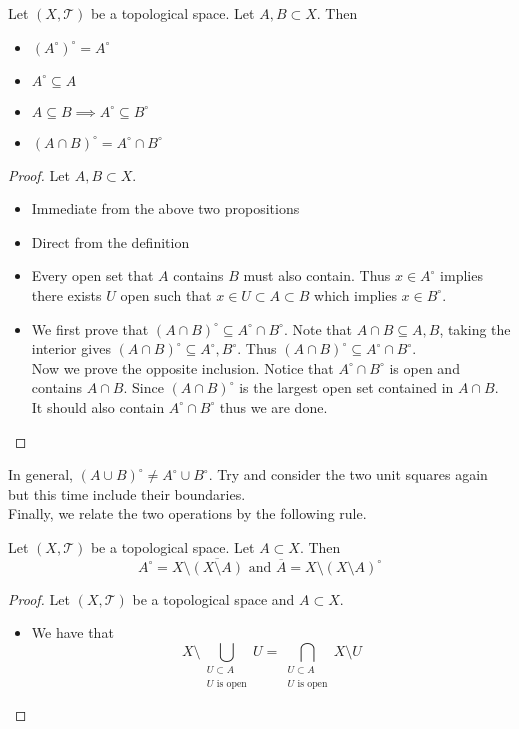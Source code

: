 \documentclass[a4paper]{article}
\begin{document}
\begin{prp}{}{} Let $(X,\mathcal{T})$ be a topological space. Let $A,B\subset X$. Then
\begin{itemize}
\item $(A^\circ)^\circ=A^\circ$
\item $A^\circ\subseteq A$
\item $A\subseteq B\implies A^\circ\subseteq B^\circ$
\item $(A\cap B)^\circ=A^\circ\cap B^\circ$
\end{itemize}
\begin{proof} Let $A,B\subset X$. 
\begin{itemize}
\item Immediate from the above two propositions
\item Direct from the definition
\item Every open set that $A$ contains $B$ must also contain. Thus $x\in A^\circ$ implies there exists $U$ open such that $x\in U\subset A\subset B$ which implies $x\in B^\circ$. 
\item We first prove that $(A\cap B)^\circ\subseteq A^\circ\cap B^\circ$. Note that $A\cap B\subseteq A,B$, taking the interior gives $(A\cap B)^\circ\subseteq A^\circ,B^\circ$. Thus $(A\cap B)^\circ\subseteq A^\circ\cap B^\circ$. \\
Now we prove the opposite inclusion. Notice that $A^\circ\cap B^\circ$ is open and contains $A\cap B$. Since $(A\cap B)^\circ$ is the largest open set contained in $A\cap B$. It should also contain $A^\circ\cap B^\circ$ thus we are done. 
\end{itemize}
\end{proof}
\end{prp}

In general, $(A\cup B)^\circ\neq A^\circ\cup B^\circ$. Try and consider the two unit squares again but this time include their boundaries. \\
Finally, we relate the two operations by the following rule. 

\begin{prp}{}{} Let $(X,\mathcal{T})$ be a topological space. Let $A\subset X$. Then $$A^\circ=X\setminus\overline{(X\setminus A)}\text{ and }\overline{A}=X\setminus(X\setminus A)^\circ$$ 
\begin{proof}
Let $(X,\mathcal{T})$ be a topological space and $A\subset X$. 
\begin{itemize}
\item We have that $$X\setminus\bigcup_{\substack{U\subset A\\U\text{ is open}}}U=\bigcap_{\substack{U\subset A\\U\text{ is open}}}X\setminus U$$
\end{itemize}
\end{proof}
\end{prp}
\end{document}
